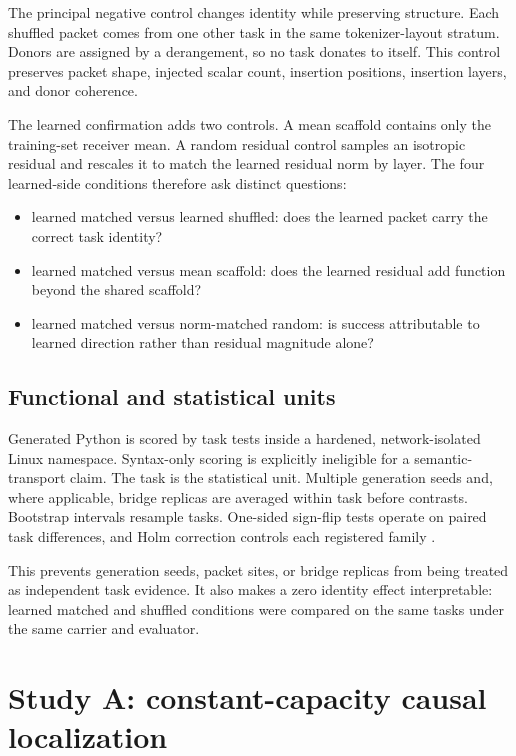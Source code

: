 \documentclass[11pt]{article}
\begin{document}
The principal negative control changes identity while preserving structure. Each shuffled packet comes from one other task in the same tokenizer-layout stratum. Donors are assigned by a derangement, so no task donates to itself. This control preserves packet shape, injected scalar count, insertion positions, insertion layers, and donor coherence.

The learned confirmation adds two controls. A mean scaffold contains only the training-set receiver mean. A random residual control samples an isotropic residual and rescales it to match the learned residual norm by layer. The four learned-side conditions therefore ask distinct questions:

\begin{itemize}
  \item learned matched versus learned shuffled: does the learned packet carry the correct task identity?
  \item learned matched versus mean scaffold: does the learned residual add function beyond the shared scaffold?
  \item learned matched versus norm-matched random: is success attributable to learned direction rather than residual magnitude alone?
\end{itemize}

\subsection{Functional and statistical units}

Generated Python is scored by task tests inside a hardened, network-isolated Linux namespace. Syntax-only scoring is explicitly ineligible for a semantic-transport claim. The task is the statistical unit. Multiple generation seeds and, where applicable, bridge replicas are averaged within task before contrasts. Bootstrap intervals resample tasks. One-sided sign-flip tests operate on paired task differences, and Holm correction controls each registered family \cite{holm1979}.

This prevents generation seeds, packet sites, or bridge replicas from being treated as independent task evidence. It also makes a zero identity effect interpretable: learned matched and shuffled conditions were compared on the same tasks under the same carrier and evaluator.

\section{Study A: constant-capacity causal localization}
\end{document}
